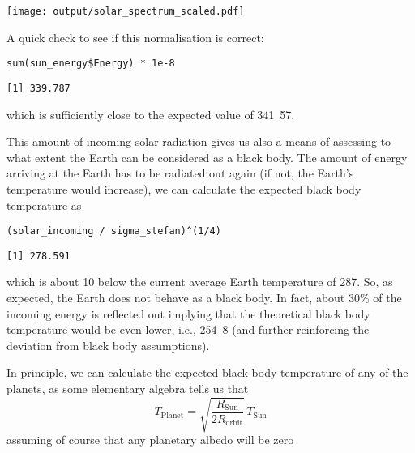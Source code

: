 \documentclass[10pt,a4paper,titlepage]{article}
\begin{document}
\texttt{[image: output/solar\_spectrum\_scaled.pdf]}

A quick check to see if this normalisation is correct:
\begin{lstlisting}
sum(sun_energy$Energy) * 1e-8
\end{lstlisting}

\begin{verbatim}
[1] 339.787
\end{verbatim}

which is sufficiently close to the expected value of
\unit{341.57}{\watt\per\metre\squared}.

This amount of incoming solar radiation gives us also a means of
assessing to what extent the Earth can be considered as a black
body. The amount of energy arriving at the Earth has to be radiated
out again (if not, the Earth's temperature would increase), we can
calculate the expected black body temperature as
\begin{lstlisting}
(solar_incoming / sigma_stefan)^(1/4)
\end{lstlisting}

\begin{verbatim}
[1] 278.591
\end{verbatim}

which is about \unit{10}{\kelvin} below the current average Earth
temperature of \unit{287}{\kelvin}. So, as expected, the Earth does
not behave as a black body. In fact, about 30\% of the incoming energy
is reflected out \citep{trenberth-al09:budget} implying that the
theoretical black body temperature would be even lower, i.e.,
\unit{254.8}{\kelvin} (and further reinforcing the deviation from
black body assumptions).

In principle, we can calculate the expected black body temperature of
any of the planets, as some elementary algebra tells us that
\begin{equation}
T_{\mathrm{Planet}} = \sqrt{\frac{R_{\mathrm{Sun}}}{2 R_{\mathrm{orbit}}}} \, T_{\mathrm{Sun}}
\end{equation}
assuming of course that any planetary albedo will be zero
\end{document}
